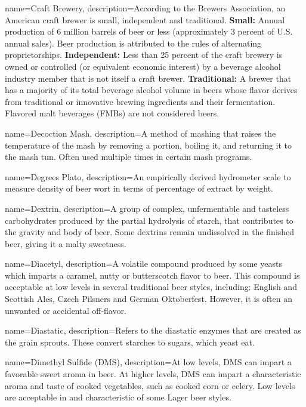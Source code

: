 {
  name={Craft Brewery},
  description={According to the Brewers Association, an American craft brewer is small, independent and traditional.  \textbf{Small:} Annual production of 6 million barrels of beer or less (approximately 3 percent of U.S. annual sales). Beer production is attributed to the rules of alternating proprietorships.  \textbf{Independent:} Less than 25 percent of the craft brewery is owned or controlled (or equivalent economic interest) by a beverage alcohol industry member that is not itself a craft brewer.  \textbf{Traditional:} A brewer that has a majority of its total beverage alcohol volume in beers whose flavor derives from traditional or innovative brewing ingredients and their fermentation. Flavored malt beverages (FMBs) are not considered beers.  }
  }

{
  name={Decoction Mash},
  description={A method of mashing that raises the temperature of the mash by removing a portion, boiling it, and returning it to the mash tun. Often used multiple times in certain mash programs.}
  }

{
  name={Degrees Plato},
  description={An empirically derived hydrometer scale to measure density of beer wort in terms of percentage of extract by weight.}
  }

{
  name={Dextrin},
  description={A group of complex, unfermentable and tasteless carbohydrates produced by the partial hydrolysis of starch, that contributes to the gravity and body of beer. Some dextrins remain undissolved in the finished beer, giving it a malty sweetness.}
  }

{
  name={Diacetyl},
  description={A volatile compound produced by some yeasts which imparts a caramel, nutty or butterscotch flavor to beer. This compound is acceptable at low levels in several traditional beer styles, including: English and Scottish Ales, Czech Pilsners and German Oktoberfest. However, it is often an unwanted or accidental off-flavor.}
  }

{
  name={Diastatic},
  description={Refers to the diastatic enzymes that are created as the grain sprouts. These convert starches to sugars, which yeast eat.}
  }

{
  name={Dimethyl Sulfide (DMS)},
  description={At low levels, DMS can impart a favorable sweet aroma in beer. At higher levels, DMS can impart a characteristic aroma and taste of cooked vegetables, such as cooked corn or celery. Low levels are acceptable in and characteristic of some Lager beer styles.}
  }

